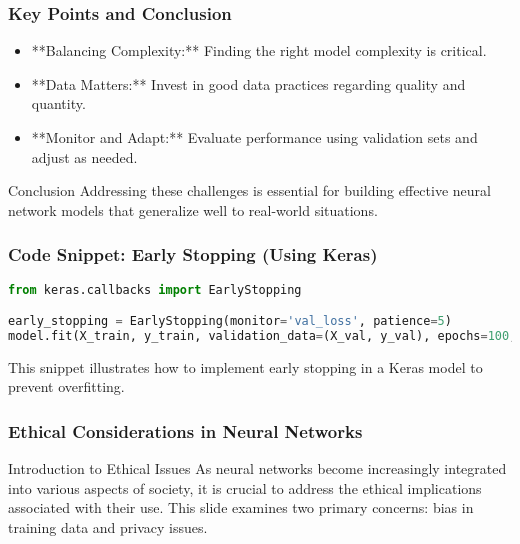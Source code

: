 \documentclass[aspectratio=169]{beamer}
\begin{document}
\begin{frame}[fragile]
    \frametitle{Key Points and Conclusion}
    \begin{itemize}
        \item **Balancing Complexity:**
        Finding the right model complexity is critical.
        
        \item **Data Matters:**
        Invest in good data practices regarding quality and quantity.
        
        \item **Monitor and Adapt:**
        Evaluate performance using validation sets and adjust as needed.
    \end{itemize}
    
    \begin{block}{Conclusion}
        Addressing these challenges is essential for building effective neural network models that generalize well to real-world situations.
    \end{block}
\end{frame}

\begin{frame}[fragile]
    \frametitle{Code Snippet: Early Stopping (Using Keras)}
    \begin{lstlisting}[language=Python]
from keras.callbacks import EarlyStopping

early_stopping = EarlyStopping(monitor='val_loss', patience=5)
model.fit(X_train, y_train, validation_data=(X_val, y_val), epochs=100, callbacks=[early_stopping])
    \end{lstlisting}
    This snippet illustrates how to implement early stopping in a Keras model to prevent overfitting.
\end{frame}

\begin{frame}[fragile]
    \frametitle{Ethical Considerations in Neural Networks}
    \begin{block}{Introduction to Ethical Issues}
        As neural networks become increasingly integrated into various aspects of society, it is crucial to address the ethical implications associated with their use. This slide examines two primary concerns: bias in training data and privacy issues.
    \end{block}
\end{frame}
\end{document}
